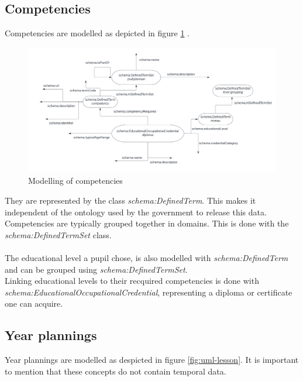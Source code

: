 \documentclass[12pt,journal]{IEEEtran}
\begin{document}
\subsection{Competencies}
\noindent Competencies are modelled as depicted in figure \ref{fig:uml-comp} .

\begin{figure}[h]
    \caption{Modelling of competencies}
    \label{fig:uml-comp}
    \includegraphics[scale=0.3]{uml-competencies.png}
\end{figure}
\noindent They are represented by the class \textit{schema:DefinedTerm}. This makes it independent of the ontology used by the government to release this data.\\
Competencies are typically grouped together in domains. This is done with the \textit{schema:DefinedTermSet} class.\\ \\
The educational level a pupil chose, is also modelled with \textit{schema:DefinedTerm} and can be grouped using \textit{schema:DefinedTermSet}.\\
Linking educational levels to their recquired competencies is done with \textit{schema:EducationalOccupationalCredential}, representing a diploma or certificate one can acquire.

\subsection{Year plannings}
\label{subsection:yearplan}
\noindent Year plannings are modelled as despicted in figure \ref{fig:uml-lesson}.
It is important to mention that these concepts do not contain temporal data.
\end{document}
